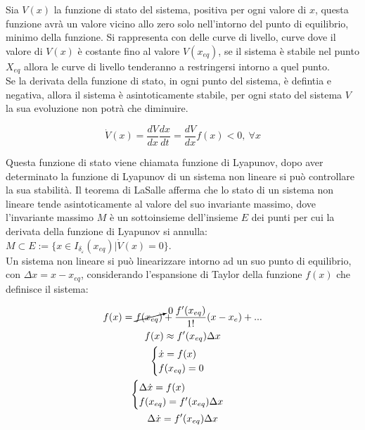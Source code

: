 \documentclass{article}
\numberwithin{equation}{subsection}
\begin{document}
Sia $V(x)$ la funzione di stato del sistema, positiva per ogni valore di $x$, questa funzione avrà un valore vicino allo zero solo 
nell'intorno del punto di equilibrio, minimo della funzione. Si rappresenta con delle curve di livello, curve dove il valore di $V(x)$ è costante fino al valore 
$V(x_{eq})$, se il sistema è stabile nel punto $X_{eq}$ allora le curve di livello tenderanno a restringersi intorno a quel punto. \\

Se la derivata della funzione di stato, in ogni punto del sistema, è defintia e negativa, allora il sistema è asintoticamente stabile, per ogni stato del sistema $V$ la sua 
evoluzione non potrà che diminuire.

\begin{equation}
    \dot V(x)=\displaystyle\frac{dV}{dx}\frac{dx}{dt}=\frac{dV}{dx}f(x)<0,\:\forall x
\end{equation}

Questa funzione di stato viene chiamata funzione di Lyapunov, dopo aver determinato la funzione di Lyapunov di un sistema non lineare si può controllare la sua stabilità. 
Il teorema di LaSalle afferma che lo stato di un sistema non lineare tende asintoticamente al valore del suo invariante massimo, dove l'invariante massimo $M$ è un sottoinsieme 
dell'insieme $E$ dei punti per cui la derivata della funzione di Lyapunov si annulla: $M\subset E:=\{x\in I_{\delta_{\varepsilon}}(x_{eq})\big|\dot V(x)=0\}$. \\

Un sistema non lineare si può linearizzare intorno ad un suo punto di equilibrio, con $\Delta x=x-x_{eq}$, considerando l'espansione di Taylor della funzione $f(x)$ che 
definisce il sistema:

\begin{gather}
    f(x)=\cancelto{0}{f(x_{eq})}+\displaystyle\frac{f'(x_{eq})}{1!}{(x-x_e)}+...\\
    f(x)\approx f'(x_{eq})\Delta x\\
    \begin{cases}
        \dot x=f(x)\\
        f(x_{eq})=0
    \end{cases}\\
    \begin{cases}
        \Delta\dot x=f(x)\\
        f(x_{eq})=f'(x_{eq})\Delta x
    \end{cases}\\
    \Delta\dot x=f'(x_{eq})\Delta x
\end{gather}
\end{document}
